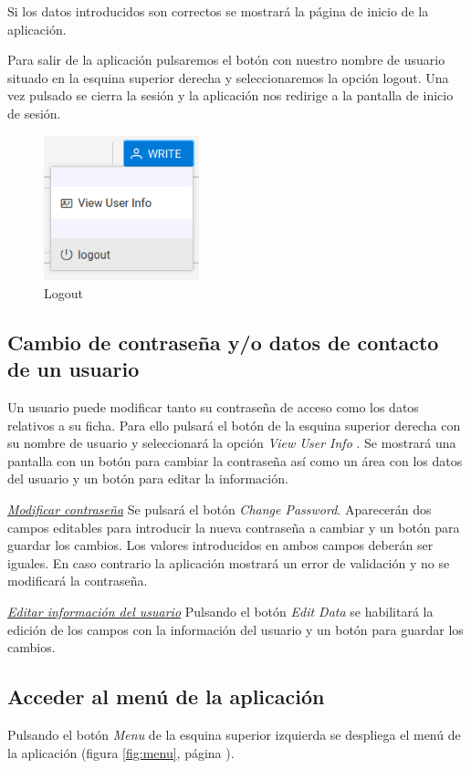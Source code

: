 Si los datos introducidos son correctos se mostrará la página de inicio de la aplicación.

Para salir de la aplicación pulsaremos el botón con nuestro nombre de usuario situado en la esquina superior derecha y seleccionaremos la opción logout. Una vez pulsado se cierra la sesión y la aplicación nos redirige a la pantalla de inicio de sesión.

\begin{figure}[H]
  \centering
  \includegraphics[width=0.40\textwidth]{imaxes/logout.png}
  \caption{Logout}
  \label{fig:login}
\end{figure}


\subsection{Cambio de contraseña y/o datos de contacto de un usuario}
\label{sub:contraseña}
Un usuario puede modificar tanto su contraseña de acceso como los datos relativos a su ficha. Para ello pulsará el botón de la esquina superior derecha con su nombre de usuario y seleccionará la opción \textit{View User Info} .
Se mostrará una pantalla con un botón para cambiar la contraseña así como un área con los datos del usuario y un botón para editar la información.

\underline{\textsl{Modificar contraseña}}
Se pulsará el botón \emph{Change Password}. Aparecerán dos campos editables para introducir la nueva contraseña a cambiar y un botón para guardar los cambios. Los valores introducidos en ambos campos deberán ser iguales. En caso contrario la aplicación mostrará un error de validación y no se modificará la contraseña.

\underline{\textsl{Editar información del usuario}}
Pulsando el botón \emph{Edit Data} se habilitará la edición de los campos con la información del usuario y un botón para guardar los cambios.


\subsection{Acceder al menú de la aplicación}
\label{sub:menu}
Pulsando el botón \emph{Menu} de la esquina superior izquierda se despliega el menú de la aplicación (figura \ref{fig:menu}, página \pageref{fig:menu}).

